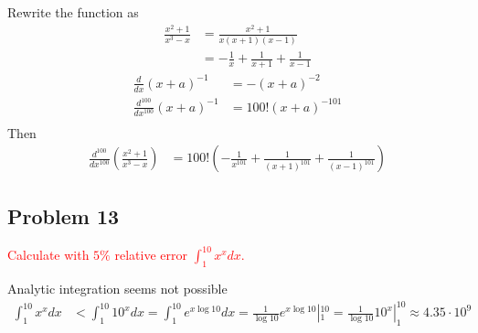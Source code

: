 \documentclass[10pt,a4paper]{book}
\theoremstyle{definition}
\begin{document}
Rewrite the function as
\begin{align}
    \frac{x^2+1}{x^3-x}&=\frac{x^2+1}{x(x+1)(x-1)}\\
    &=-\frac{1}{x}+\frac{1}{x+1}+\frac{1}{x-1}
\end{align}
\begin{align}
    \frac{d}{dx}(x+a)^{-1}&=-(x+a)^{-2}\\
    \frac{d^{100}}{dx^{100}}(x+a)^{-1}&=100!(x+a)^{-101}\\
\end{align}
Then
\begin{align}
    \frac{d^{100}}{dx^{100}}\left(\frac{x^2+1}{x^3-x}\right)&=100!\left(-\frac{1}{x^{101}}+\frac{1}{(x+1)^{101}}+\frac{1}{(x-1)^{101}}\right)
\end{align}

\subsection{Problem 13}
\textcolor{red}{Calculate with $5\%$ relative error $\int_1^{10} x^x dx$.}

Analytic integration seems not possible 
\begin{align}
    \int_1^{10} x^x dx&<\int_1^{10} 10^x dx=\int_1^{10} e^{x\log10} dx=\frac{1}{\log 10}e^{x\log10}|_1^{10}=\frac{1}{\log 10}10^x|_1^{10}\approx4.35\cdot10^{9}
\end{align}
\end{document}
